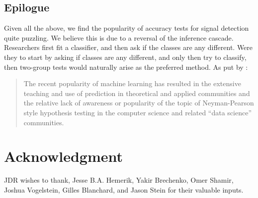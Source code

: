 \documentclass[onecolumn,draftclsnofoot]{IEEEtran}
\begin{document}
\subsection{Epilogue}
Given all the above, we find the popularity of accuracy tests for signal detection quite puzzling. 
We believe this is due to a reversal of the inference cascade. 
Researchers first fit a classifier, and then ask if the classes are any different.
Were they to start by asking if classes are any different, and only then try to classify, then two-group tests would naturally arise as the preferred method. 
As put by \cite{ramdas_classification_2016}:
\begin{quote}
	The recent popularity of machine learning has resulted in the extensive teaching and use
	of prediction in theoretical and applied communities and the relative lack of awareness or
	popularity of the topic of Neyman-Pearson style hypothesis testing in the computer science
	and related ``data science'' communities.
\end{quote}




\section*{Acknowledgment}
JDR wishes to thank, Jesse B.A. Hemerik, Yakir Brechenko, Omer Shamir, Joshua Vogelstein, Gilles Blanchard, and Jason Stein for their valuable inputs. 

\ifCLASSOPTIONcaptionsoff
  \newpage
\fi






%

%
%
\end{document}
